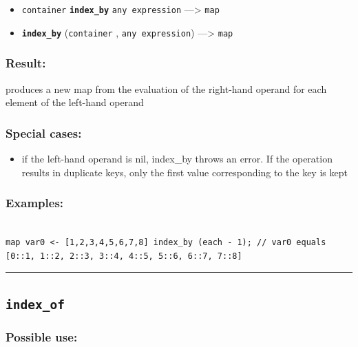 \documentclass[]{book}
\providecommand{\tightlist}{%
  \setlength{\itemsep}{0pt}\setlength{\parskip}{0pt}}
\theoremstyle{definition}
\theoremstyle{definition}
\theoremstyle{definition}
\theoremstyle{remark}
\begin{document}
\begin{itemize}
\tightlist
\item
  \texttt{container} \textbf{\texttt{index\_by}}
  \texttt{any\ expression} ---\textgreater{} \texttt{map}
\item
  \textbf{\texttt{index\_by}} (\texttt{container} ,
  \texttt{any\ expression}) ---\textgreater{} \texttt{map}
\end{itemize}

\subsubsection{Result:}\label{result-263}

produces a new map from the evaluation of the right-hand operand for
each element of the left-hand operand

\subsubsection{Special cases:}\label{special-cases-78}

\begin{itemize}
\tightlist
\item
  if the left-hand operand is nil, index\_by throws an error. If the
  operation results in duplicate keys, only the first value
  corresponding to the key is kept
\end{itemize}

\subsubsection{Examples:}\label{examples-207}

\begin{verbatim}
 
map var0 <- [1,2,3,4,5,6,7,8] index_by (each - 1); // var0 equals [0::1, 1::2, 2::3, 3::4, 4::5, 5::6, 6::7, 7::8]
\end{verbatim}

\begin{center}\rule{0.5\linewidth}{\linethickness}\end{center}

\subsection{\texorpdfstring{\texttt{index\_of}}{index\_of}}\label{index_of}

\subsubsection{Possible use:}\label{possible-use-274}
\end{document}
